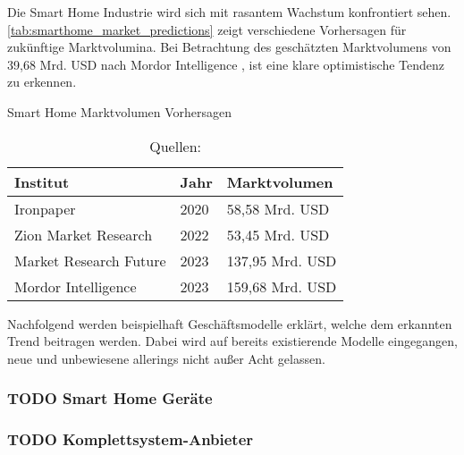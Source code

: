Die Smart Home Industrie wird sich mit rasantem Wachstum konfrontiert sehen.
\autoref{tab:smarthome_market_predictions} zeigt verschiedene Vorhersagen für zukünftige Marktvolumina.
Bei Betrachtung des geschätzten Marktvolumens von 39,68 Mrd. USD nach Mordor Intelligence , ist eine klare optimistische Tendenz zu erkennen.

\begin{table}[ht]
	\caption{Smart Home Marktvolumen Vorhersagen}
	\centering
	\begin{tabular}{| p{} | p{} | p{} |}
		\hline
		\textbf{Institut} 	& \textbf{Jahr} & \textbf{Marktvolumen} \\ \hline
		Ironpaper & 2020 & 58,58 Mrd. USD \\ \hline
		Zion Market Research & 2022 & 53,45 Mrd. USD \\ \hline
		Market Research Future & 2023 & 137,95 Mrd. USD \\ \hline
		Mordor Intelligence & 2023 & 159,68 Mrd. USD \\ \hline
	\end{tabular}
	\caption*{\footnotesize{Quellen: }}
	\label{tab:smarthome_market_predictions}
\end{table}

Nachfolgend werden beispielhaft Geschäftsmodelle erklärt, welche dem erkannten Trend beitragen werden.
Dabei wird auf bereits existierende Modelle eingegangen, neue und unbewiesene allerings nicht außer Acht gelassen.

\subsubsection{\textbf{TODO} Smart Home Geräte} %



\subsubsection{\textbf{TODO} Komplettsystem-Anbieter}




